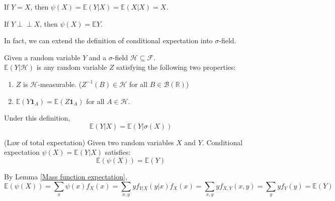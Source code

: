 \documentclass{huhtakm-template-book}
\newcommand{\independent}{\perp\!\!\!\perp}
\newcommand{\expect}{\mathbb{E}}
\begin{document}
    \begin{eg}
        If $Y=X$, then $\psi(X)=\expect(Y|X)=\expect(X|X)=X$.
    \end{eg}
    \begin{eg}
        If $Y\independent X$, then $\psi(X)=\expect Y$.
    \end{eg}
    In fact, we can extend the definition of conditional expectation into $\sigma$-field.
    \begin{defn}
        Given a random variable $Y$ and a $\sigma$-field $\mathcal{H}\subseteq\mathcal{F}$.\\
        $\expect(Y|\mathcal{H})$ is any random variable $Z$ satisfying the following two properties:
        \begin{enumerate}
            \item $Z$ is $\mathcal{H}$-measurable. ($Z^{-1}(B)\in\mathcal{H}$ for all $B\in\mathcal{B}(\mathbb{R})$)
            \item $\expect(Y\mathbf{1}_{A})=\expect(Z\mathbf{1}_{A})$ for all $A\in\mathcal{H}$.
        \end{enumerate}
    \end{defn}
    \begin{rem}
        Under this definition,
        \begin{equation*}
            \expect(Y|X)=\expect(Y|\sigma(X))
        \end{equation*}
    \end{rem}
    \begin{thm}(Law of total expectation)
    Given two random variables $X$ and $Y$. Conditional expectation $\psi(X)=\expect(Y|X)$ satisfies:
        \begin{equation*}
            \expect(\psi(X))=\expect(Y)
        \end{equation*}
    \end{thm}
    \begin{proofing}
        By Lemma \ref{Mass function expectation},
        \begin{equation*}
            \expect(\psi(X))=\sum_{x}\psi(x)f_{X}(x)=\sum_{x,y}yf_{Y|X}(y|x)f_{X}(x)=\sum_{x,y}yf_{X,Y}(x,y)=\sum_{y}yf_{Y}(y)=\expect(Y)
        \end{equation*}
    \end{proofing}
\end{document}
